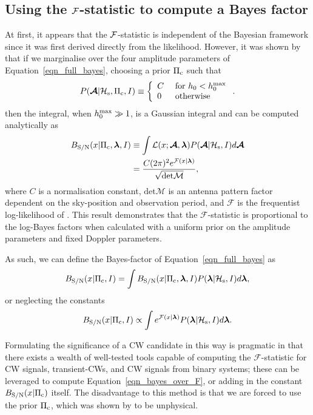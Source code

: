 \documentclass[aps, prd, twocolumn, superscriptaddress, floatfix, showpacs, nofootinbib, longbibliography]{revtex4-1}
\begin{document}
\subsection{Using the ${\mathcal{F}}$-statistic to compute a Bayes factor} At first, it
appears that the ${\mathcal{F}}$-statistic is independent of the Bayesian framework since
it was first derived directly from the likelihood. However, it was shown by
\citet{prix2009} that if we marginalise over the four amplitude parameters of
Equation~\eqref{eqn_full_bayes}, choosing a prior $\Pi_{\rm c}$ such that
\begin{equation}
P(\boldsymbol{\mathcal{A}}| \mathcal{H}_{\rm s}, \Pi_{\rm c}, I) \equiv \left\{
\begin{array}{ll}
C & \textrm{ for } h_0 < h_0^{\rm max} \\
0 & \textrm{ otherwise}
\end{array}
\right..
\end{equation}
then the integral, when $h_0^{\rm max} \gg 1$, is a Gaussian integral and can be
computed analytically as
\begin{align}
B_{\rm S/N}(x| \Pi_{\rm c}, \boldsymbol{\mathbf{\lambda}}, I) & \equiv
\int
\mathcal{L}(x ;\boldsymbol{\mathcal{A}}, \boldsymbol{\mathbf{\lambda}})
P(\boldsymbol{\mathcal{A}}| \mathcal{H}_{\rm s}, I) d\boldsymbol{\mathcal{A}}
\label{eqn_B_S_N}
\\
& = \frac{C (2\pi)^{2} e^{{\mathcal{F}}(x| \boldsymbol{\mathbf{\lambda}})}}
{\sqrt{\textrm{det} \mathcal{M}}},
\end{align}
where $C$ is a normalisation constant, $\textrm{det}\mathcal{M}$ is an antenna
pattern factor dependent on the sky-position and observation period, and
$\mathcal{F}$ is the frequentist log-likelihood of \citet{jks1998}. This result
demonstrates that the $\mathcal{F}$-statistic is proportional to the log-Bayes
factors when calculated with a uniform prior on the amplitude parameters and
fixed Doppler parameters.

As such, we can define the Bayes-factor of Equation~\eqref{eqn_full_bayes} as
\begin{equation}
B_{\rm S/N}(x| \Pi_{\rm c}, I) = \int
B_{\rm S/N}(x| \Pi_{\rm c}, \boldsymbol{\mathbf{\lambda}}, I) P(\boldsymbol{\mathbf{\lambda}}| \mathcal{H}_{\rm s}, I)
 d\boldsymbol{\mathbf{\lambda}},
\end{equation}
or neglecting the constants
\begin{equation}
B_{\rm S/N}(x| \Pi_{\rm c}, I) \propto \int
e^{{\mathcal{F}}(x| \boldsymbol{\mathbf{\lambda}})} P(\boldsymbol{\mathbf{\lambda}}| \mathcal{H}_{\rm s}, I)
 d\boldsymbol{\mathbf{\lambda}}.
\label{eqn_bayes_over_F}
\end{equation}

Formulating the significance of a CW candidate in this way is pragmatic in that
there exists a wealth of well-tested tools \citep{lalsuite} capable of
computing the $\mathcal{F}$-statistic for CW signals, transient-CWs, and CW
signals from binary systems; these can be leveraged to compute
Equation~\eqref{eqn_bayes_over_F}, or adding in the constant
$B_{\rm S/N}(x| \Pi_{\rm c})$ itself. The disadvantage to this method is that
we are forced to use the prior $\Pi_{\rm c}$, which was shown by \citet{prix2009} to
be unphysical.
\end{document}
